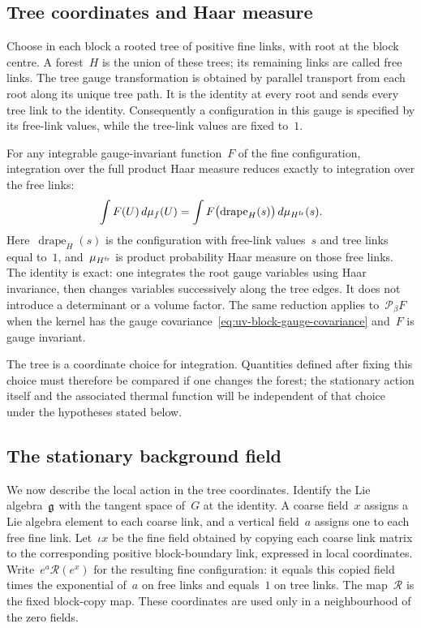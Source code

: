 \subsection{Tree coordinates and Haar measure}\label{subsec:uv-block-tree}

Choose in each block a rooted tree of positive fine links, with root at the block centre. A forest~$H$ is the union of these trees; its remaining links are called free links. The tree gauge transformation is obtained by parallel transport from each root along its unique tree path. It is the identity at every root and sends every tree link to the identity. Consequently a configuration in this gauge is specified by its free-link values, while the tree-link values are fixed to~$1$.

For any integrable gauge-invariant function~$F$ of the fine configuration, integration over the full product Haar measure reduces exactly to integration over the free links:
\begin{equation}\label{eq:uv-tree-haar}
 \int F(U)\,d\mu_f(U)
 =\int F\bigl(\operatorname{drape}_H(s)\bigr)\,d\mu_{H^{\rm fr}}(s).
\end{equation}
Here~$\operatorname{drape}_H(s)$ is the configuration with free-link values~$s$ and tree links equal to~$1$, and~$\mu_{H^{\rm fr}}$ is product probability Haar measure on those free links. The identity is exact: one integrates the root gauge variables using Haar invariance, then changes variables successively along the tree edges. It does not introduce a determinant or a volume factor. The same reduction applies to~$\mathcal P_\beta F$ when the kernel has the gauge covariance~\eqref{eq:uv-block-gauge-covariance} and~$F$ is gauge invariant.

The tree is a coordinate choice for integration. Quantities defined after fixing this choice must therefore be compared if one changes the forest; the stationary action itself and the associated thermal function will be independent of that choice under the hypotheses stated below.

\subsection{The stationary background field}\label{subsec:uv-stationary}

We now describe the local action in the tree coordinates. Identify the Lie algebra~$\mathfrak g$ with the tangent space of~$G$ at the identity. A coarse field~$x$ assigns a Lie algebra element to each coarse link, and a vertical field~$a$ assigns one to each free fine link. Let~$\iota x$ be the fine field obtained by copying each coarse link matrix to the corresponding positive block-boundary link, expressed in local coordinates. Write~$e^a\mathcal R(e^x)$ for the resulting fine configuration: it equals this copied field times the exponential of~$a$ on free links and equals~$1$ on tree links. The map~$\mathcal R$ is the fixed block-copy map. These coordinates are used only in a neighbourhood of the zero fields.

